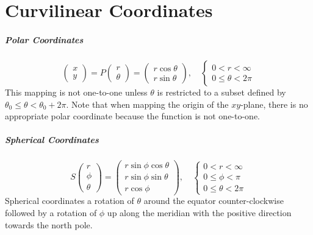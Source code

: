 \documentclass[11pt]{article}
\begin{document}
\section{Curvilinear Coordinates}
	\subparagraph{Polar Coordinates}
		\begin{equation}
			\begin{pmatrix}
				x\\y
			\end{pmatrix}
			= P \begin{pmatrix}
				r\\\theta
			\end{pmatrix}
			= \begin{pmatrix}
				r\cos \theta\\
				r\sin \theta
			\end{pmatrix}, \quad
			\left\lbrace
			\begin{matrix}
				0 < r < \infty\\
				0 \leq \theta < 2\pi
			\end{matrix}
			\right.
		\end{equation}
		This mapping is not one-to-one unless $\theta$ is restricted to a subset defined by $\theta_0 \leq \theta < \theta_0 + 2\pi$. Note that when mapping the origin of the $xy$-plane, there is no appropriate polar coordinate because the function is not one-to-one. 
		
	\subparagraph{Spherical Coordinates}
		\begin{equation}
			S \begin{pmatrix}
				r\\\phi\\\theta
			\end{pmatrix}
			= \begin{pmatrix}
				r\sin\phi\cos\theta\\
				r\sin\phi\sin\theta\\
				r\cos\phi
			\end{pmatrix}, \quad
			\left\lbrace
			\begin{matrix}
				0 < r < \infty\\
				0 \leq \phi < \pi\\
				0 \leq \theta < 2\pi
			\end{matrix}
			\right.
		\end{equation}
		Spherical coordinates a rotation of $\theta$ around the equator counter-clockwise followed by a rotation of $\phi$ up along the meridian with the positive direction towards the north pole.
		
\end{document}
